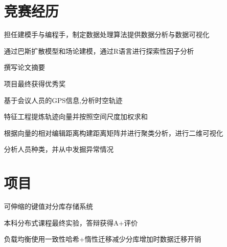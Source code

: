 \documentclass[]{deedy-resume-openfont}
\begin{document}
{\begin{minipage}[t]{0.25\textwidth}
\end{minipage} 
\hfill
\begin{minipage}[t]{0.73\textwidth} 


\section{竞赛经历}
\sectionsep
{}
\vspace{\topsep}
\begin{tightemize}
    \item 担任建模手与编程手，制定数据处理算法提供数据分析与数据可视化
    \item 通过巴斯扩散模型和场论建模，通过R语言进行探索性因子分析
    \item 撰写论文摘要

\end{tightemize}
\sectionsep
{}
\begin{tightemize}
\item 项目最终获得优秀奖
\item 基于会议人员的GPS信息,分析时空轨迹
\item 特征工程提炼轨迹向量并按照空间尺度加权求和
\item 根据向量的相对编辑距离构建距离矩阵并进行聚类分析，进行二维可视化
\item 分析人员种类，并从中发掘异常情况
\end{tightemize}
\sectionsep


\section{项目}
\sectionsep


\begin{tightemize}
    \item 可伸缩的键值对分库存储系统
    \item 本科分布式课程最终实验，答辩获得A+评价
    \item 负载均衡使用一致性哈希+惰性迁移减少分库增加时数据迁移开销
    \end{tightemize}
\sectionsep


\end{minipage}}
\end{document}
